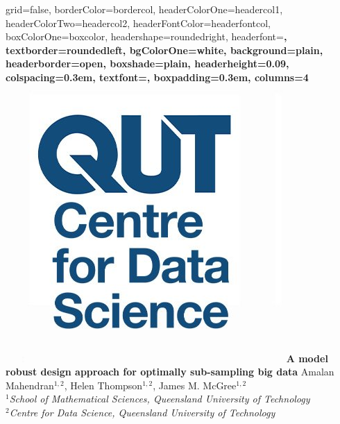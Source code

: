 \documentclass[a0paper,portrait]{baposter}
\begin{document}
\begin{poster}{
    grid=false,
    borderColor=bordercol,
    headerColorOne=headercol1, 
    headerColorTwo=headercol2,
    headerFontColor=headerfontcol, 
    boxColorOne=boxcolor, 
    headershape=roundedright, 
    headerfont=\large\sf\bf, 
    textborder=roundedleft,
    bgColorOne=white,
    background=plain,
    headerborder=open, 
    boxshade=plain,
    headerheight=0.09\textheight,
    colspacing=0.3em,
    textfont=\normalsize\sffamily,
    boxpadding=0.3em,
    columns=4
}
{\includegraphics[scale=0.25]{QUT_logo.jpg}}
{\bf \huge {A model robust design approach for optimally sub-sampling big data} }
{\vspace{0.3em} \smaller Amalan Mahendran$^{1,2}$, Helen Thompson$^{1,2}$, James M. McGree$^{1,2}$ \\
\normalsize{$^1$\it {School of Mathematical Sciences, Queensland University of Technology}} \\ $^2$\it{Centre for Data Science, Queensland University of Technology} }

\end{poster}
\end{document}
